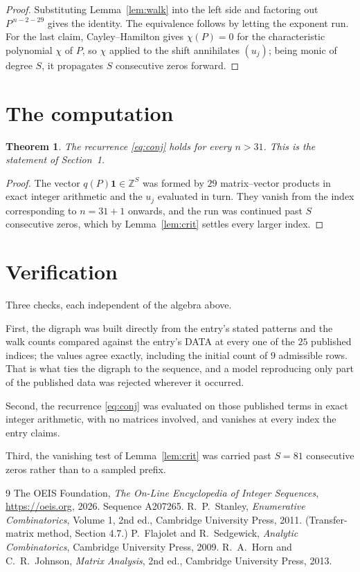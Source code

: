 \documentclass[11pt,a4paper]{article}
\theoremstyle{plain}
\newtheorem{theorem}{Theorem}
\theoremstyle{definition}
\begin{document}
\begin{proof}
Substituting Lemma~\ref{lem:walk} into the left side and factoring out
$P^{\,n-2-29}$ gives the identity. The equivalence follows by letting the exponent
run. For the last claim, Cayley--Hamilton gives $\chi(P)=0$ for the characteristic
polynomial $\chi$ of $P$, so $\chi$ applied to the shift annihilates $(u_j)$; being monic of
degree $S$, it propagates $S$ consecutive zeros forward.
\end{proof}

\section{The computation}

\begin{theorem}
The recurrence \eqref{eq:conj} holds for every $n>31$. This is the statement of
Section~1.
\end{theorem}

\begin{proof}
The vector $q(P)\mathbf{1}\in\mathbb{Z}^{S}$ was formed by $29$ matrix--vector
products in exact integer arithmetic and the $u_j$ evaluated in turn. They vanish from the
index corresponding to $n=31+1$ onwards, and the run was continued past $S$ consecutive
zeros, which by Lemma~\ref{lem:crit} settles every larger index.
\end{proof}

\section{Verification}

Three checks, each independent of the algebra above.

First, the digraph was built directly from the entry's stated patterns and the walk counts
compared against the entry's DATA at every one of the $25$ published indices; the
values agree exactly, including the initial count of $9$ admissible rows. That is
what ties the digraph to the sequence, and a model reproducing only part of the published
data was rejected wherever it occurred.

Second, the recurrence \eqref{eq:conj} was evaluated on those published terms in exact
integer arithmetic, with no matrices involved, and vanishes at every index the entry claims.

Third, the vanishing test of Lemma~\ref{lem:crit} was carried past $S=81$ consecutive
zeros rather than to a sampled prefix.

\begin{thebibliography}{9}
 The OEIS Foundation, \emph{The On-Line Encyclopedia of Integer
Sequences}, \url{https://oeis.org}, 2026. Sequence A207265.
 R.~P.~Stanley, \emph{Enumerative Combinatorics}, Volume 1, 2nd ed.,
Cambridge University Press, 2011. (Transfer-matrix method, Section 4.7.)
 P.~Flajolet and R.~Sedgewick, \emph{Analytic Combinatorics}, Cambridge
University Press, 2009.
 R.~A.~Horn and C.~R.~Johnson, \emph{Matrix Analysis}, 2nd ed., Cambridge
University Press, 2013.
\end{thebibliography}
\end{document}
